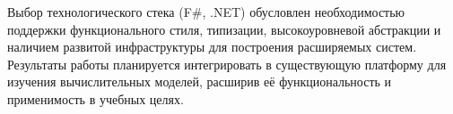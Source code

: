 Выбор технологического стека (F\#, .NET) обусловлен необходимостью поддержки функционального стиля, типизации, высокоуровневой абстракции и наличием развитой инфраструктуры для построения расширяемых систем. Результаты работы планируется интегрировать в существующую платформу для изучения вычислительных моделей, расширив её функциональность и применимость в учебных целях.

